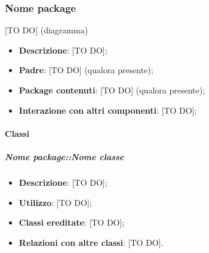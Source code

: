 


	\subsubsection{Nome package} %
	\label{ssub:nome_del_package}
	[TO DO] (diagramma) \newline \newline

	\begin{itemize}
		\item \textbf{Descrizione}: [TO DO];
		\item \textbf{Padre}: [TO DO] (qualora presente);
		\item \textbf{Package contenuti}: [TO DO] (qualora presente);
		\item \textbf{Interazione con altri componenti}: [TO DO];
	\end{itemize}

		\paragraph{Classi} %
			\subparagraph{Nome package::Nome classe} %
			\label{subp:subparagraph_name}
				\begin{itemize}
					\item \textbf{Descrizione}: [TO DO];
					\item \textbf{Utilizzo}: [TO DO];
					\item \textbf{Classi ereditate}: [TO DO];
					\item \textbf{Relazioni con altre classi}: [TO DO].
				\end{itemize}



